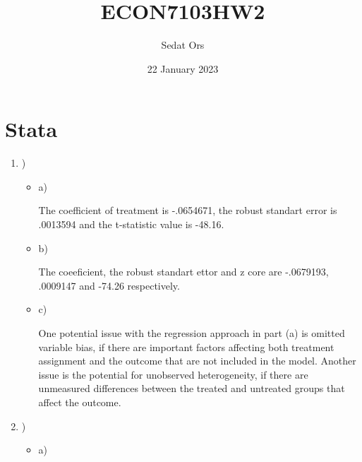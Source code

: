 \documentclass{article}
\title{ECON7103HW2}
\author{Sedat Ors}
\date{22 January 2023}
\begin{document}
\maketitle

\section{Stata}

\vspace{0.5cm}

\begin{enumerate}

\item )

\begin{itemize}

\item a)

\vspace{0.5cm}

The coefficient of treatment is  -.0654671, the robust standart error is .0013594 and the t-statistic value is -48.16. 
\vspace{0.5cm}

\item b)

\vspace{0.5cm}
The coeeficient, the robust standart ettor and z core are  -.0679193, .0009147 and  -74.26 respectively.

\vspace{0.5cm}

\item c)

\vspace{0.5cm}

One potential issue with the regression approach in part (a) is omitted variable bias, if there are important factors affecting both treatment assignment and the outcome that are not included in the model. Another issue is the potential for unobserved heterogeneity, if there are unmeasured differences between the treated and untreated groups that affect the outcome.

\end {itemize}
\vspace{0.5cm}

\item )
\begin{itemize}

\item a)

\vspace{0.5cm}


\end{itemize}
\end{enumerate}
\end{document}
